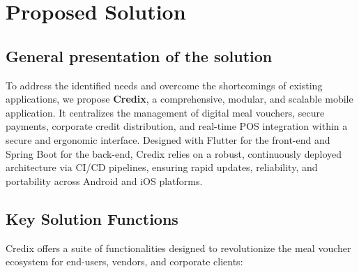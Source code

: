 \section{Proposed Solution}

\subsection{General presentation of the solution}

To address the identified needs and overcome the shortcomings of existing applications, we propose \textbf{Credix}, a comprehensive, modular, and scalable mobile application. It centralizes the management of digital meal vouchers, secure payments, corporate credit distribution, and real-time POS integration within a secure and ergonomic interface. Designed with Flutter for the front-end and Spring Boot for the back-end, Credix relies on a robust, continuously deployed architecture via CI/CD pipelines, ensuring rapid updates, reliability, and portability across Android and iOS platforms.

\subsection{Key Solution Functions}

Credix offers a suite of functionalities designed to revolutionize the meal voucher ecosystem for end-users, vendors, and corporate clients:

